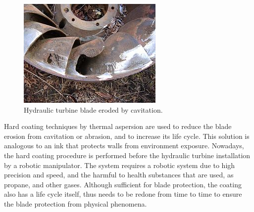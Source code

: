 \begin{figure}[h!]	
	\includegraphics[width=\columnwidth]{figs/intro/cavitacao}
	\caption{Hydraulic turbine blade eroded by cavitation.}
	\label{fig::cavitacao}
\end{figure}

Hard coating techniques by thermal aspersion
are used to reduce the blade erosion from cavitation or abrasion,
and to increase its life cycle. This solution is analogous to an ink that
protects walls from environment exposure. Nowadays, the hard coating procedure is performed
before the hydraulic turbine installation by a robotic manipulator. The system
requires a robotic system due to high precision and speed, and
the harmful to health substances that are used, as propane, and other gases.
Although sufficient for blade protection, the coating also has a life
cycle itself, thus needs to be redone from time to time to ensure the
blade protection from physical phenomena.

